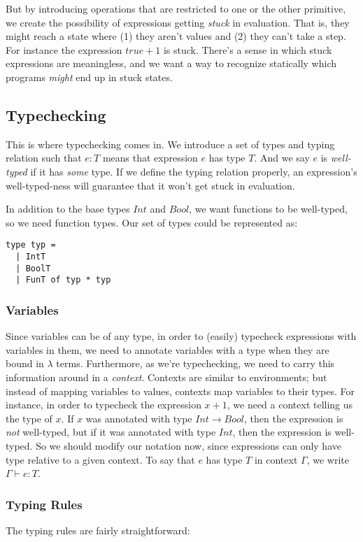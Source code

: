 \documentclass[pageno]{jpaper}
\begin{document}
{But by introducing operations that are restricted to one or the other primitive,
we create the possibility of expressions getting \textit{stuck} in evaluation.
That is, they might reach a state where (1) they aren't values and (2) they can't take a step. For instance the expression $true + 1$ is stuck. There's a sense in
which stuck expressions are meaningless, and we want a way to recognize statically which programs \textit{might} end up in stuck states.

\subsection{Typechecking}
This is where typechecking comes in.  We introduce a set of types and typing relation such that $e:T$ means that expression $e$ has type $T$. And we say $e$ is \textit{well-typed} if it has \textit{some} type. If we define the typing relation properly, an expression's well-typed-ness will guarantee that it won't get stuck in evaluation.

In addition to the base types $Int$ and $Bool$, we want functions to be well-typed, so we need function types. Our set of types could be represented as:

\begin{lstlisting}
type typ = 
  | IntT
  | BoolT
  | FunT of typ * typ
\end{lstlisting}

\subsubsection{Variables}
Since variables can be of any type, in order to (easily) typecheck expressions with variables in them, we need to annotate variables with a type when they are bound in $\lambda$ terms.  Furthermore, as we're typechecking, we need to carry this information around in a \textit{context}. Contexts are similar to environments; but instead of mapping variables to
values, contexts map variables to their types. For instance, in order to typecheck the expression $x + 1$, we need a context telling us the type of $x$. If $x$ was annotated with
type $Int \rightarrow Bool$, then the expression is \textit{not} well-typed, but if
it was annotated with type $Int$, then the expression is well-typed. So we should modify our
notation now, since expressions can only have type relative to a given context.
To say that $e$ has type $T$ in context $\Gamma$, we write $\Gamma \vdash e:T$.

\subsubsection{Typing Rules}
The typing rules are fairly straightforward:

}
\end{document}

